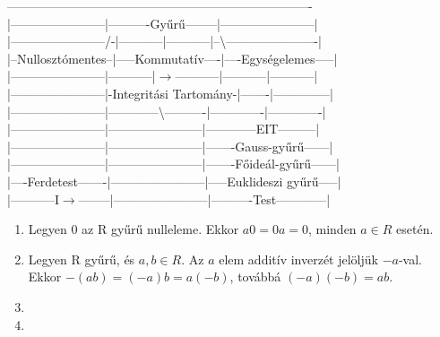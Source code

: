 \begin{frame}
\begin{tcolorbox}[title={Algebrai struktúrák kpacsolata (Kép)}]
-------------------------------------------------------------------------\\
|-----------------------|----------Gyűrű--------|-----------------------|\\
|-----------------------/-|-----------|-----------|--{\textbackslash}----------------------|\\
|--Nullosztómentes--|-----Kommutatív----|----Egységelemes-----|\\
|-----------------------|-----------|$\rightarrow$-----------|-----------|-----------|\\
|-----------------------|-Integritási Tartomány-|-------|--------------|\\
|-----------------------|------------{\textbackslash}----------|-------------|-------------|\\
|-----------------------|-----------------------|------------EIT---------|\\
|-----------------------|-----------------------|-------Gauss-gyűrű------|\\
|-----------------------|-----------------------|-------Főideál-gyűrű------|\\
|----Ferdetest-------|-----------------------|-----Euklideszi gyűrű-----|\\
|-----------I$\rightarrow$--------|-----------------------|----------Test------------|\\
\end{tcolorbox}
\end{frame}

\begin{frame}
  \begin{tcolorbox}[title={Lemma: Észrevételek gyűrűkben}]
    \begin{enumerate}
      \item {} Legyen 0 az R gyűrű nulleleme. Ekkor $a0 = 0a = 0$, minden $a \in R$ esetén.
      \item {} Legyen R gyűrű, és $a, b \in R$. Az $a$ elem additív inverzét jelöljük $-a$-val. Ekkor $-(ab) = (-a)b = a(-b)$, továbbá $(-a)(-b) = ab$.
      \item {}
      \item {}
    \end{enumerate}
  \end{tcolorbox}
\end{frame}

